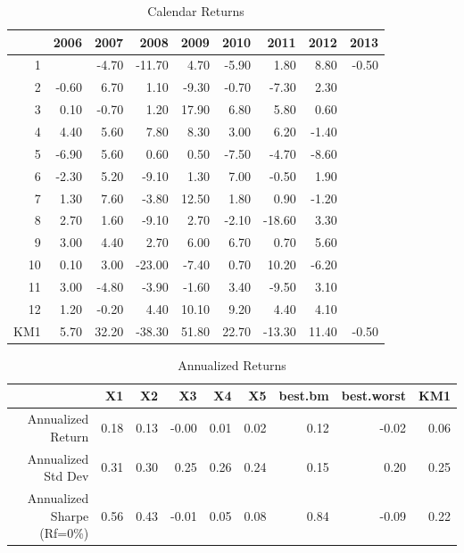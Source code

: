 \documentclass{article}
\begin{document}
\begin{table}[ht]
\begin{center}
\caption{Calendar Returns}
\begin{tabular}{rrrrrrrrr}
  \hline
 & 2006 & 2007 & 2008 & 2009 & 2010 & 2011 & 2012 & 2013 \\ 
  \hline
1 &  & -4.70 & -11.70 & 4.70 & -5.90 & 1.80 & 8.80 & -0.50 \\ 
  2 & -0.60 & 6.70 & 1.10 & -9.30 & -0.70 & -7.30 & 2.30 &  \\ 
  3 & 0.10 & -0.70 & 1.20 & 17.90 & 6.80 & 5.80 & 0.60 &  \\ 
  4 & 4.40 & 5.60 & 7.80 & 8.30 & 3.00 & 6.20 & -1.40 &  \\ 
  5 & -6.90 & 5.60 & 0.60 & 0.50 & -7.50 & -4.70 & -8.60 &  \\ 
  6 & -2.30 & 5.20 & -9.10 & 1.30 & 7.00 & -0.50 & 1.90 &  \\ 
  7 & 1.30 & 7.60 & -3.80 & 12.50 & 1.80 & 0.90 & -1.20 &  \\ 
  8 & 2.70 & 1.60 & -9.10 & 2.70 & -2.10 & -18.60 & 3.30 &  \\ 
  9 & 3.00 & 4.40 & 2.70 & 6.00 & 6.70 & 0.70 & 5.60 &  \\ 
  10 & 0.10 & 3.00 & -23.00 & -7.40 & 0.70 & 10.20 & -6.20 &  \\ 
  11 & 3.00 & -4.80 & -3.90 & -1.60 & 3.40 & -9.50 & 3.10 &  \\ 
  12 & 1.20 & -0.20 & 4.40 & 10.10 & 9.20 & 4.40 & 4.10 &  \\ 
  KM1 & 5.70 & 32.20 & -38.30 & 51.80 & 22.70 & -13.30 & 11.40 & -0.50 \\ 
   \hline
\end{tabular}
\end{center}
\end{table}%
\begin{table}[ht]
\begin{center}
\caption{Annualized Returns}
\begin{tabular}{rrrrrrrrr}
  \hline
 & X1 & X2 & X3 & X4 & X5 & best.bm & best.worst & KM1 \\ 
  \hline
Annualized Return & 0.18 & 0.13 & -0.00 & 0.01 & 0.02 & 0.12 & -0.02 & 0.06 \\ 
  Annualized Std Dev & 0.31 & 0.30 & 0.25 & 0.26 & 0.24 & 0.15 & 0.20 & 0.25 \\ 
  Annualized Sharpe (Rf=0\%) & 0.56 & 0.43 & -0.01 & 0.05 & 0.08 & 0.84 & -0.09 & 0.22 \\ 
   \hline
\end{tabular}
\end{center}
\end{table}%
\end{document}
